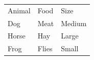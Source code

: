 \documentclass{article}
\begin{document}
	\begin{tabular}{lll}
		Animal & Food & Size \\
		Dog & Meat & Medium \\
		Horse & Hay & Large \\
		Frog & Flies & Small \\
	\end{tabular}
\end{document}
